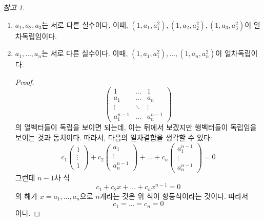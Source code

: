 \documentclass[unfonts,oneside,a4paper]{oblivoir}
\theoremstyle{definition}
\theoremstyle{theorem}
\theoremstyle{theorem}
\theoremstyle{remark}
\newtheorem*{remark}{참고}
\theoremstyle{remark}
\theoremstyle{remark}
\theoremstyle{remark}
\newcommand{\vecz}{\bm{\mathrm{0}}}
\begin{document}
\begin{remark}
    \leavevmode
    \begin{enumerate}
        \item $a_1, a_2, a_3$는 서로 다른 실수이다.
            이때, $\left(1, a_1, a_1^2\right), \left(1, a_2, a_2^2\right), \left(1, a_3, a_3^2\right)$이 일차독립임이다.
        \item $a_1, \dots, a_n$는 서로 다른 실수이다.
            이때, $\left(1, a_1, a_1^2\right), \dots, \left(1, a_n, a_n^2\right)$이 일차독립이다.
            \begin{proof}
                \leavevmode
                \begin{equation*}
                    \begin{pmatrix}
                        1 & \dots & 1\\
                        a_1 & \dots & a_n\\
                        \vdots & \ddots & \vdots\\
                        a_1^{n - 1} & \dots & a_n^{n - 1}
                    \end{pmatrix}
                \end{equation*}
                의 열벡터들이 독립을 보이면 되는데, 이는 뒤에서 보겠지만 행벡터들이 독립임을 보이는 것과 동치이다.
                따라서, 다음의 일차결합을 생각할 수 있다:
                \begin{equation*}
                    c_1
                    \begin{pmatrix}
                        1 \\ \vdots \\ 1
                    \end{pmatrix}
                    + c_2
                    \begin{pmatrix}
                        a_1 \\ \vdots \\ a_n^{n - 1}
                    \end{pmatrix}
                    + \dots + c_n
                    \begin{pmatrix}
                        a_1^{n - 1} \\ \vdots \\ a_n^{n - 1}
                    \end{pmatrix}
                    = \vecz
                \end{equation*}
                그런데 $n - 1$차 식
                \begin{equation*}
                    c_1 + c_2 x + \dots + c_n x^{n - 1} = 0
                \end{equation*}
                의 해가 $x = a_1, \dots, a_n$으로 $n$개라는 것은 위 식이 항등식이라는 것이다.
                따라서
                \begin{equation*}
                    c_1 = \dots = c_n = 0
                \end{equation*}
                이다.
            \end{proof}
    \end{enumerate}
\end{remark}
\end{document}
